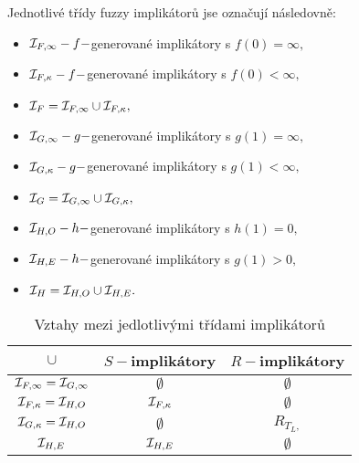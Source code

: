 Jednotlivé třídy fuzzy implikátor\r u jse označují následovně:
\begin{itemize}
\item ${\cal I}_{F, \infty}- f-$generované implikátory s $f(0) = \infty,$ 
\item ${\cal I}_{F, \kappa}- f-$generované implikátory s $f(0) < \infty,$ 
\item ${\cal I}_{F} = {\cal I}_{F, \infty} \cup{\cal I}_{F, \kappa}, $
\item ${\cal I}_{G, \infty} - g-$generované implikátory s $g(1) = \infty,$ 
\item ${\cal I}_{G, \kappa} - g-$generované implikátory s $g(1) < \infty,$ 
\item ${\cal I}_{G}={\cal I}_{G, \infty} \cup{\cal I}_{G, \kappa},$ 
\item ${\cal I}_{H, O} - h-$generované implikátory s $h(1) = 0,$ 
\item ${\cal I}_{H, E} - h-$generované implikátory s $g(1) >0,$ 
\item ${\cal I}_{H}= {\cal I}_{H, O} \cup {\cal I}_{H, E}.$ 
\end{itemize} 



\begin{table}[ht!]
    \caption{Vztahy mezi jedlotlivými třídami implikátor\r u\cite{hlinena}}
    \centering 
    \begin{tabular}{|c|c|c|}
    \hline
     $\cup$ & $S-$implikátory & $R-$implikátory\\
    \hline
    ${\cal I}_{F, \infty} = {\cal I}_{G, \infty}$   & $ \emptyset$ & $\emptyset$ \\
    \hline
    ${\cal I}_{F, \kappa} = {\cal I}_{H, O}$   &  ${\cal I}_{F, \kappa}$ &
    $\emptyset$ \\
    \hline
    ${\cal I}_{G, \kappa} = {\cal I}_{H, O}$   &  $\emptyset$ &
    $R_{T_L,}$ \\
    \hline
    ${\cal I}_{H, E}$  &${\cal I}_{H, E}$ &  $\emptyset$\\
    \hline
    \end{tabular}
\end{table}

